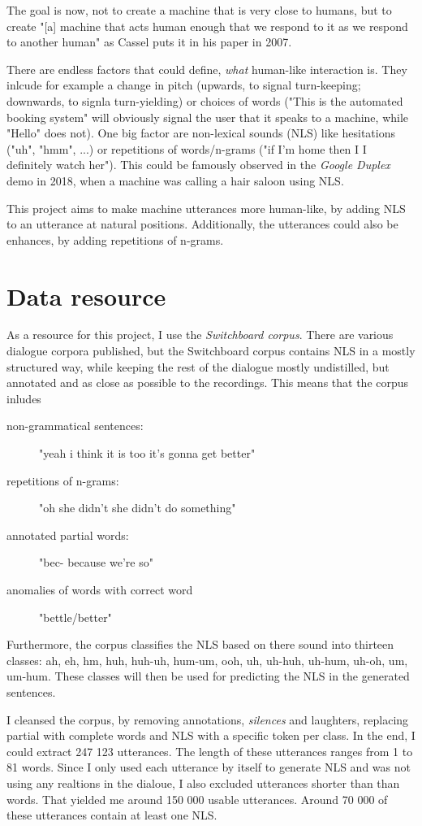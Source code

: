 \documentclass[
	11pt, %
]{fphw}
\begin{document}
The goal is now, not to create a machine that is very close to humans, but to create "[a] machine that acts human enough that we respond to it as we respond to another human" as Cassel puts it in his paper in 2007.

There are endless factors that could define, \emph{what} human-like interaction is. They inlcude for example a change in pitch (upwards, to signal turn-keeping; downwards, to signla turn-yielding) or choices of words ("This is the automated booking system" will obviously signal the user that it speaks to a machine, while "Hello" does not). One big factor are non-lexical sounds (NLS) like hesitations ("uh", "hmm", ...) or repetitions of words/n-grams ("if I'm home then I I definitely watch her"). This could be famously observed in the \emph{Google Duplex} demo in 2018, when a machine was calling a hair saloon using NLS.

This project aims to make machine utterances more human-like, by adding NLS to an utterance at natural positions. Additionally, the utterances could also be enhances, by adding repetitions of n-grams.

\section*{Data resource}
As a resource for this project, I use the \emph{Switchboard corpus}. There are various dialogue corpora published, but the Switchboard corpus contains NLS in a mostly structured way, while keeping the rest of the dialogue mostly undistilled, but annotated and as close as possible to the recordings. This means that the corpus inludes 
\begin{description}
    \item[non-grammatical sentences:] "yeah i think it is too it's gonna get better"
    \item[repetitions of n-grams:] "oh she didn't she didn't do something"
    \item[annotated partial words:] "bec- because we're so"
    \item[anomalies of words with correct word] "bettle/better"
\end{description}

Furthermore, the corpus classifies the NLS based on there sound into thirteen classes: ah, eh, hm, huh, huh-uh, hum-um, ooh, uh, uh-huh, uh-hum, uh-oh, um, um-hum. These classes will then be used for predicting the NLS in the generated sentences. 

I cleansed the corpus, by removing annotations, \emph{silences} and laughters, replacing partial with complete words and NLS with a specific token per class. In the end, I could extract 247 123 utterances. The length of these utterances ranges from 1 to 81 words. Since I only used each utterance by itself to generate NLS and was not using any realtions in the dialoue, I also excluded utterances shorter than than words. That yielded me around 150 000 usable utterances. Around 70 000 of these utterances contain at least one NLS.
\end{document}
